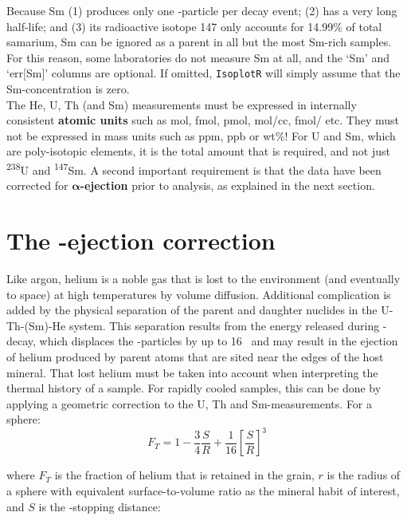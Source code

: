 \begin{refsection}
Because Sm (1) produces only one \textalpha-particle per decay event;
(2) has a very long half-life; and (3) its radioactive isotope 147
only accounts for 14.99\% of total samarium, Sm can be ignored as a
parent in all but the most Sm-rich samples. For this reason, some
laboratories do not measure Sm at all, and the `Sm' and `err[Sm]'
columns are optional. If omitted, \texttt{IsoplotR} will simply assume
that the Sm-concentration is zero.\\

The He, U, Th (and Sm) measurements must be expressed in internally
consistent \textbf{atomic units} such as mol, fmol, pmol, mol/cc,
fmol/ etc. They must not be expressed in mass units such as ppm,
ppb or wt\%! For U and Sm, which are poly-isotopic elements, it is the
total amount that is required, and not just \textsuperscript{238}U and
\textsuperscript{147}Sm. A second important requirement is that the
data have been corrected for $\mathbf{\alpha}$\textbf{-ejection} prior
to analysis, as explained in the next section.

\section{The \textalpha-ejection correction}

Like argon, helium is a noble gas that is lost to the environment (and
eventually to space) at high temperatures by volume diffusion.
Additional complication is added by the physical separation of the
parent and daughter nuclides in the U-Th-(Sm)-He system. This
separation results from the energy released during \textalpha-decay,
which displaces the \textalpha-particles by up to 16~ and may
result in the ejection of helium produced by parent atoms that are
sited near the edges of the host mineral. That lost helium must be
taken into account when interpreting the thermal history of a
sample. For rapidly cooled samples, this can be done by applying a
geometric correction to the U, Th and Sm-measurements. For a sphere:
\begin{equation}
  F_T = 1 - \frac{3}{4}\frac{S}{R} + \frac{1}{16} \left[\frac{S}{R}\right]^3
    \label{eq:FTsphere}
\end{equation}

\noindent where $F_T$ is the fraction of helium that is retained in
the grain, $r$ is the radius of a sphere with equivalent
surface-to-volume ratio as the mineral habit of interest, and $S$ is
the \textalpha-stopping distance:


\end{refsection}
